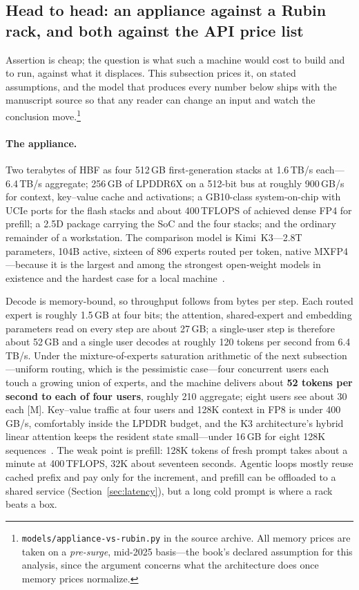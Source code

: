 \subsection{Head to head: an appliance against a Rubin rack, and both against the API price list}
\label{sec:appliance-cost}

Assertion is cheap; the question is what such a machine would cost to build and to run, against what it displaces. This subsection prices it, on stated assumptions, and the model that produces every number below ships with the manuscript source so that any reader can change an input and watch the conclusion move.\footnote{\texttt{models/appliance-vs-rubin.py} in the source archive. All memory prices are taken on a \emph{pre-surge}, mid-2025 basis---the book's declared assumption for this analysis, since the argument concerns what the architecture does once memory prices normalize.}

\paragraph{The appliance.} Two terabytes of HBF as four 512\,GB first-generation stacks at 1.6\,TB/s each---6.4\,TB/s aggregate; 256\,GB of LPDDR6X on a 512-bit bus at roughly 900\,GB/s for context, key--value cache and activations; a GB10-class system-on-chip with UCIe ports for the flash stacks and about 400\,TFLOPS of achieved dense FP4 for prefill; a 2.5D package carrying the SoC and the four stacks; and the ordinary remainder of a workstation. The comparison model is Kimi~K3---2.8T parameters, 104B active, sixteen of 896 experts routed per token, native MXFP4---because it is the largest and among the strongest open-weight models in existence and the hardest case for a local machine~\cite{kimi-k3-card,kimi-k3-arch}.

Decode is memory-bound, so throughput follows from bytes per step. Each routed expert is roughly 1.5\,GB at four bits; the attention, shared-expert and embedding parameters read on every step are about 27\,GB; a single-user step is therefore about 52\,GB and a single user decodes at roughly 120 tokens per second from 6.4\,TB/s. Under the mixture-of-experts saturation arithmetic of the next subsection---uniform routing, which is the pessimistic case---four concurrent users each touch a growing union of experts, and the machine delivers about \textbf{52 tokens per second to each of four users}, roughly 210 aggregate; eight users see about 30 each [M]. Key--value traffic at four users and 128K context in FP8 is under 400\,GB/s, comfortably inside the LPDDR budget, and the K3 architecture's hybrid linear attention keeps the resident state small---under 16\,GB for eight 128K sequences~\cite{kimi-k3-arch}. The weak point is prefill: 128K tokens of fresh prompt takes about a minute at 400\,TFLOPS, 32K about seventeen seconds. Agentic loops mostly reuse cached prefix and pay only for the increment, and prefill can be offloaded to a shared service (Section~\ref{sec:latency}), but a long cold prompt is where a rack beats a box.

